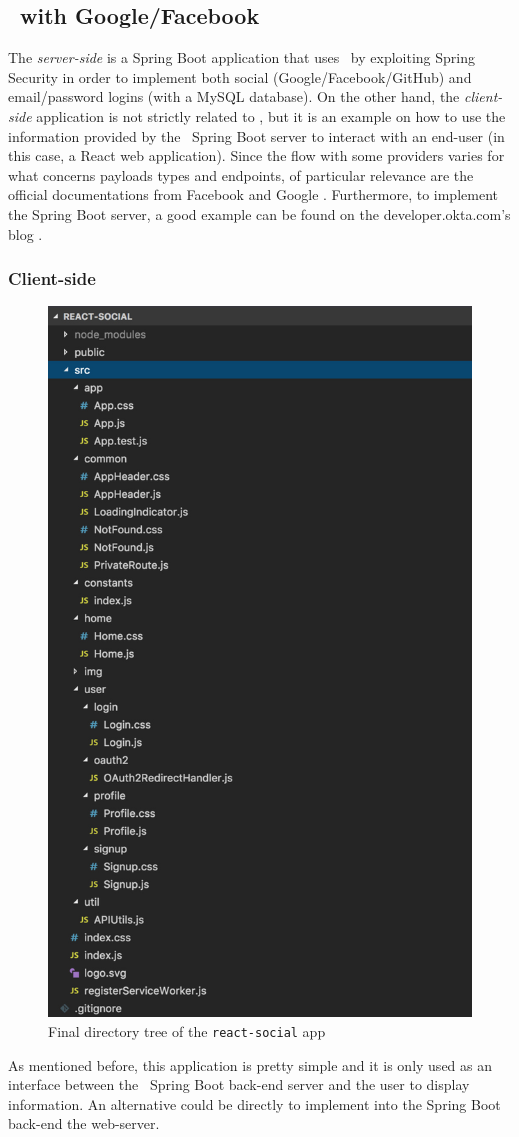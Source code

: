 \subsection{\oauth\ with Google/Facebook}
The \textit{server-side} is a Spring Boot application that uses \oauth\ by exploiting Spring Security in order to implement both social (Google/Facebook/GitHub) and email/password logins (with a MySQL database). On the other hand, the \textit{client-side} application is not strictly related to \oauth, but it is an example on how to use the information provided by the \oauth\ Spring Boot server to interact with an end-user (in this case, a React web application). Since the flow with some providers varies for what concerns payloads types and endpoints, of particular relevance are the official documentations from Facebook \cite{facebook} and Google \cite{google1, google2}. Furthermore, to implement the Spring Boot server, a good example can be found on the developer.okta.com's blog \cite{sprboot}. 

\subsubsection{Client-side}

\begin{figure}
  \begin{center}
    \includegraphics[width=0.30 \textwidth]{chapters/images/chp6/dirreact.jpg}
  \end{center}
  \caption{Final directory tree of the \texttt{react-social} app}
  \label{fig:dirtree}
\end{figure}

As mentioned before, this application is pretty simple and it is only used as an interface between the \oauth\ Spring Boot back-end server and the user to display information. An alternative could be directly to implement into the Spring Boot back-end the web-server.

